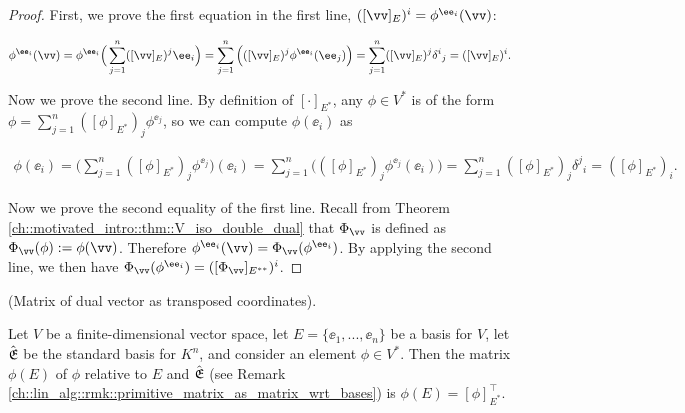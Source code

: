 \begin{proof}
    First, we prove the first equation in the first line, $([\vv]_E)^i = \phi^{\ee_i}(\vv)$:
    
    \begin{align*}
        \phi^{\ee_i}(\vv) = \phi^{\ee_i}\Big( \sum_{j = 1}^n ([\vv]_E)^j \ee_i \Big) = \sum_{j = 1}^n \Big( ([\vv]_E)^j \phi^{\ee_i}(\ee_j) \Big) = \sum_{j = 1}^n ([\vv]_E)^j \delta^i{}_j = ([\vv]_E)^i.
    \end{align*}
    
    Now we prove the second line. By definition of $[\cdot]_{E^*}$, any $\phi \in V^*$ is of the form $\phi = \sum_{j = 1}^n ([\phi]_{E^*})_j \phi^{\ee_j}$, so we can compute $\phi(\ee_i)$ as
    
    \begin{align*}
        \phi(\ee_i) = \Big( \sum_{j = 1}^n ([\phi]_{E^*})_j \phi^{\ee_j} \Big)(\ee_i) = \sum_{j = 1}^n \Big( ([\phi]_{E^*})_j \phi^{\ee_j}(\ee_i)\Big) = \sum_{j = 1}^n ([\phi]_{E^*})_j \delta^j{}_i = ([\phi]_{E^*})_i.
    \end{align*}
    
    Now we prove the second equality of the first line. Recall from Theorem \ref{ch::motivated_intro::thm::V_iso_double_dual} that $\Phi_\vv$ is defined as $\Phi_\vv(\phi) := \phi(\vv)$. Therefore $\phi^{\ee_i}(\vv) = \Phi_\vv(\phi^{\ee_i})$. By applying the second line, we then have $\Phi_\vv(\phi^{\ee_i}) = ([\Phi_\vv]_{E^{**}})^i$.
\end{proof}

\begin{theorem}
    \label{ch::bilinear_forms_metric_tensors::thm::matrix_of_dual_vector_as_trtransposed_coords}
    
    (Matrix of dual vector as transposed coordinates).
    
    Let $V$ be a finite-dimensional vector space, let $E = \{\ee_1, ..., \ee_n\}$ be a basis for $V$, let ${\hat{\mathfrak{E}}}$ be the standard basis for $K^n$, and consider an element $\phi \in V^*$. Then the matrix $\phi(E)$ of $\phi$ relative to $E$ and ${\hat{\mathfrak{E}}}$ (see Remark \ref{ch::lin_alg::rmk::primitive_matrix_as_matrix_wrt_bases}) is $\phi(E) = [\phi]_{E^*}^\top$.
\end{theorem}

